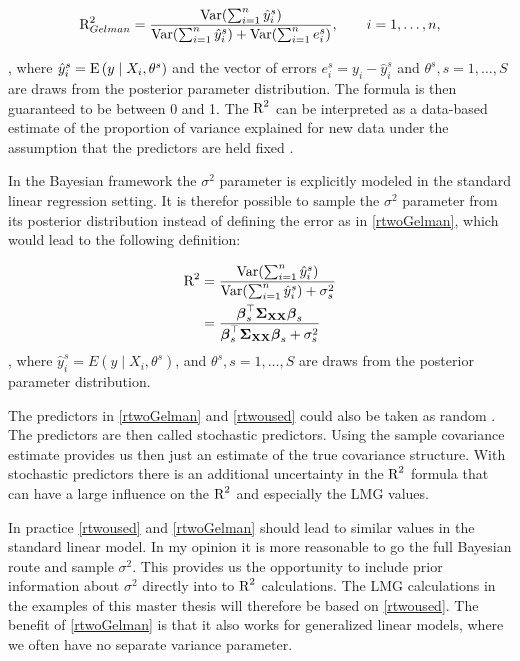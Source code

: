 \documentclass[11pt,a4paper,twoside]{book}\usepackage[]{graphicx}\usepackage[]{color}
\begin{document}
      \begin{align} 
       \text{R}^2_{Gelman} = \frac{\operatorname{Var}(\sum_{i=1}^{n}\hat{y}^s_{i})}{\operatorname{Var}(\sum_{i=1}^{n}\hat{y}^s_{i})+\operatorname{Var}(\sum_{i=1}^{n}e^s_{i})}, \qquad i = 1,\dots,n, \label{rtwoGelman} 
   \end{align} 
   
, where $\hat{y}^s_{i}  = \operatorname{E} \left({y \mid X_{i}, \theta^s}\right) $ and the vector of errors $e^s_{i} = y_{i} - \hat{y}^s_{i}$ and $\theta^s, s = 1,\dotsc, S$ are draws from the posterior parameter distribution. The formula is then guaranteed to be between 0 and 1. The $\text{R}^2$ can  be interpreted as a data-based estimate of the proportion of variance explained for new data under the assumption that the predictors are held fixed \citep{Gelman2017}.

In the Bayesian framework the $\sigma^2$ parameter is explicitly modeled in the standard linear regression setting. It is therefor possible to sample the $\sigma^2$ parameter from its posterior distribution instead of defining the error as in \eqref{rtwoGelman}, which would lead to the following definition:

    \begin{align} 
        \text{R}^2 &= \frac{\operatorname{Var}(\sum_{i=1}^{n}\hat{y}^s_{i})}{\operatorname{Var}(\sum_{i=1}^{n}\hat{y}^s_{i})+\sigma_{s}^2} \\ &= \frac{{\boldsymbol{\beta}}_{s}^\top {\boldsymbol{\Sigma}}{}_{{\mathbf{X}} {\mathbf{X}}}  {\boldsymbol{\beta}}_{s}}{{\boldsymbol{\beta}}_{s}^\top {\boldsymbol{\Sigma}}{}_{{\mathbf{X}} {\mathbf{X}}}  {\boldsymbol{\beta}}_{s}+\sigma_{s}^2}\label{rtwoused} 
   \end{align} 
 , where $\hat{y}^s_{i}  = E \left({y \mid X_{i}, \theta^s}\right) $,  and $\theta^s, s = 1,\dotsc, S$ are draws from the posterior parameter distribution.


The predictors in \eqref{rtwoGelman} and \eqref{rtwoused} could also be taken as random \citep{Gelman2017}. The predictors are then called stochastic predictors. Using the sample covariance estimate provides us then just an estimate of the true covariance structure. With stochastic predictors there is an additional uncertainty in the $\text{R}^2$ formula that can have a large influence on the $\text{R}^2$ and especially the LMG values.

In practice \eqref{rtwoused} and \eqref{rtwoGelman} should lead to  similar values in the standard linear model. In my opinion it is more reasonable to go the full Bayesian route and sample  $\sigma^2$. This provides us the opportunity to include prior information about $\sigma^2$ directly into to $\text{R}^2$ calculations. The LMG calculations in the examples of this master thesis will therefore be based on \eqref{rtwoused}.  The benefit of \eqref{rtwoGelman} is that it also works for generalized linear models, where we often have no separate variance parameter.
\end{document}
